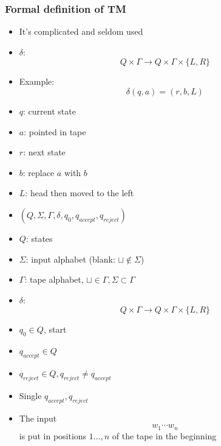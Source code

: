 \begin{frame}[allowframebreaks] \frametitle{Formal definition of TM}
  \begin{itemize}
\item It's complicated and seldom used
\item $\delta$:
  \begin{equation*}
  Q\times \Gamma\rightarrow 
Q\times \Gamma \times\{L,R\}
\end{equation*}
\item Example:
  \begin{equation*}
  \delta(q,a) = (r,b,L)
\end{equation*}
\item [] $q$: current state

\item [] $a$: pointed in tape

\item [] $r$: next state

\item [] $b$: replace $a$ with $b$
\item [] $L$: head then moved to the left
\item $(Q,\Sigma, \Gamma, \delta, q_0, q_{accept},
q_{reject})$

\item [] $Q$: states

\item [] $\Sigma$: input alphabet (blank: $\sqcup \notin \Sigma$)

\item [] $\Gamma$: tape alphabet, $\sqcup \in \Gamma, 
\Sigma \subset \Gamma$

\item [] $\delta$:
  \begin{equation*}
  Q\times \Gamma \rightarrow
Q \times \Gamma \times 
\{L,R\}
\end{equation*}
\item [] $q_0 \in Q$, start

\item [] $q_{accept} \in Q$

\item [] $q_{reject} \in Q, q_{reject} \neq q_{accept}$

\item [] Single $q_{accept}, q_{reject}$

\item The input
  \begin{equation*}
  w_1\cdots w_n
\end{equation*}
is put in 
  positions $1 \ldots, n$ of the tape in the beginning


\end{itemize}
\end{frame}
